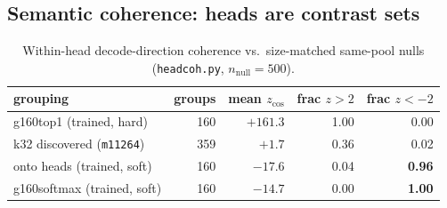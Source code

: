 \documentclass[11pt]{article}
\begin{document}
\subsection{Semantic coherence: heads are contrast sets}

\begin{table}[h]\centering\small
\begin{tabular}{@{}lrrrr@{}}
\toprule
grouping & groups & mean $z_{\cos}$ & frac $z{>}2$ & frac $z{<}{-}2$ \\
\midrule
g160top1 (trained, hard)      & 160 & $+161.3$ & 1.00 & 0.00 \\
k32 discovered (\texttt{m11264}) & 359 & $+1.7$ & 0.36 & 0.02 \\
onto heads (trained, soft)    & 160 & $-17.6$ & 0.04 & \textbf{0.96} \\
g160softmax (trained, soft)   & 160 & $-14.7$ & 0.00 & \textbf{1.00} \\
\bottomrule
\end{tabular}
\caption{Within-head decode-direction coherence vs.\ size-matched
same-pool nulls (\texttt{headcoh.py}, $n_{\text{null}}{=}500$).}
\end{table}
\end{document}
